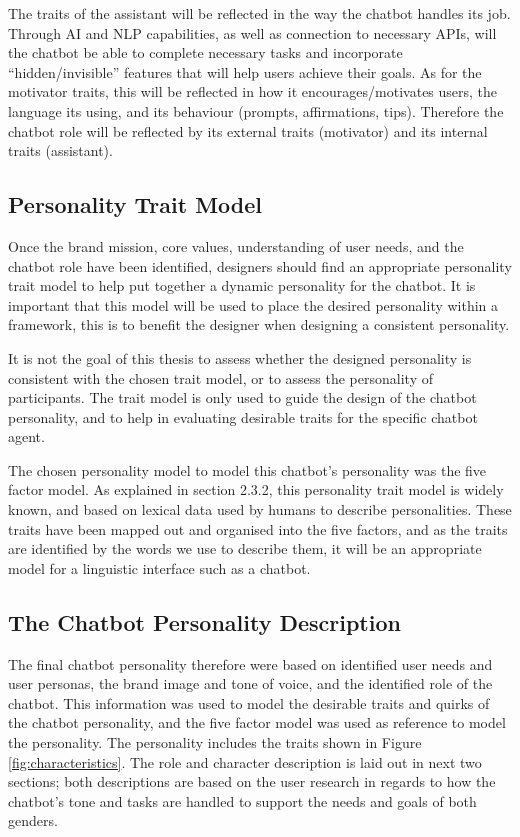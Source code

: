     The traits of the assistant will be reflected in the way the chatbot handles its job. Through AI and NLP capabilities, as well as connection to necessary APIs, will the chatbot be able to complete necessary tasks and incorporate “hidden/invisible” features that will help users achieve their goals. As for the motivator traits, this will be reflected in how it encourages/motivates users, the language its using, and its behaviour (prompts, affirmations, tips). Therefore the chatbot role will be reflected by its external traits (motivator) and its internal traits (assistant).
    
\vspace{5mm}

    \subsection{Personality Trait Model}
    Once the brand mission, core values, understanding of user needs, and the chatbot role have been identified, designers should find an appropriate personality trait model to help put together a dynamic personality for the chatbot. It is important that this model will be used to place the desired personality within a framework, this is to benefit the designer when designing a consistent personality. 
    
    It is not the goal of this thesis to assess whether the designed personality is consistent with the chosen trait model, or to assess the personality of participants. The trait model is only used to guide the design of the chatbot personality, and to help in evaluating desirable traits for the specific chatbot agent. 
    
    The chosen personality model to model this chatbot's personality was the five factor model. As explained in section 2.3.2, this personality trait model is widely known, and based on lexical data used by humans to describe personalities. These traits have been mapped out and organised into the five factors, and as the traits are identified by the words we use to describe them, it will be an appropriate model for a linguistic interface such as a chatbot.
    
\vspace{5mm}

    \subsection{The Chatbot Personality Description}
    The final chatbot personality therefore were based on identified user needs and user personas, the brand image and tone of voice, and the identified role of the chatbot. This information was used to model the desirable traits and quirks of the chatbot personality, and the five factor model was used as reference to model the personality. The personality includes the traits shown in Figure \ref{fig:characteristics}. The role and character description is laid out in next two sections; both descriptions are based on the user research in regards to how the chatbot's tone and tasks are handled to support the needs and goals of both genders.
    
